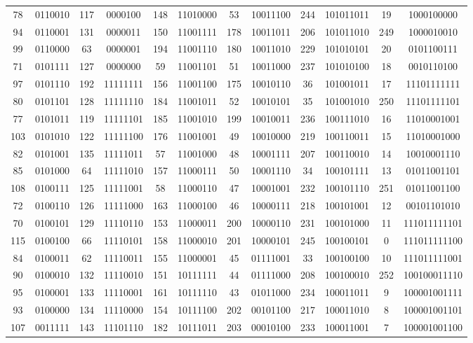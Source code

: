 \documentclass[conference,onecolumn,12pt]{IEEEtran}
\numberwithin{equation}{subsection}
\begin{document}
\begin{itemize}
\begin{table}[H]
\begin{tabular}{cccccccccccc}
78 & 0110010 & 117 & 0000100 & 148 & 11010000 & 53 & 10011100 & 244 & 101011011 & 19 & 1000100000 \\
94 & 0110001 & 131 & 0000011 & 150 & 11001111 & 178 & 10011011 & 206 & 101011010 & 249 & 1000010010 \\
99 & 0110000 & 63 & 0000001 & 194 & 11001110 & 180 & 10011010 & 229 & 101010101 & 20 & 0101100111 \\
71 & 0101111 & 127 & 0000000 & 59 & 11001101 & 51 & 10011000 & 237 & 101010100 & 18 & 0010110100 \\
97 & 0101110 & 192 & 11111111 & 156 & 11001100 & 175 & 10010110 & 36 & 101001011 & 17 & 11101111111 \\
80 & 0101101 & 128 & 11111110 & 184 & 11001011 & 52 & 10010101 & 35 & 101001010 & 250 & 11101111101 \\
77 & 0101011 & 119 & 11111101 & 185 & 11001010 & 199 & 10010011 & 236 & 100111010 & 16 & 11010001001 \\
103 & 0101010 & 122 & 11111100 & 176 & 11001001 & 49 & 10010000 & 219 & 100110011 & 15 & 11010001000 \\
82 & 0101001 & 135 & 11111011 & 57 & 11001000 & 48 & 10001111 & 207 & 100110010 & 14 & 10010001110 \\
85 & 0101000 & 64 & 11111010 & 157 & 11000111 & 50 & 10001110 & 34 & 100101111 & 13 & 01011001101 \\
108 & 0100111 & 125 & 11111001 & 58 & 11000110 & 47 & 10001001 & 232 & 100101110 & 251 & 01011001100 \\
72 & 0100110 & 126 & 11111000 & 163 & 11000100 & 46 & 10000111 & 218 & 100101001 & 12 & 00101101010 \\
70 & 0100101 & 129 & 11110110 & 153 & 11000011 & 200 & 10000110 & 231 & 100101000 & 11 & 111011111101 \\
115 & 0100100 & 66 & 11110101 & 158 & 11000010 & 201 & 10000101 & 245 & 100100101 & 0 & 111011111100 \\
84 & 0100011 & 62 & 11110011 & 155 & 11000001 & 45 & 01111001 & 33 & 100100100 & 10 & 111011111001 \\
90 & 0100010 & 132 & 11110010 & 151 & 10111111 & 44 & 01111000 & 208 & 100100010 & 252 & 100100011110 \\
95 & 0100001 & 133 & 11110001 & 161 & 10111110 & 43 & 01011000 & 234 & 100011011 & 9 & 100001001111 \\
93 & 0100000 & 134 & 11110000 & 154 & 10111100 & 202 & 00101100 & 217 & 100011010 & 8 & 100001001101 \\
107 & 0011111 & 143 & 11101110 & 182 & 10111011 & 203 & 00010100 & 233 & 100011001 & 7 & 100001001100 \\

\end{tabular}
\end{table}
\end{itemize}
\end{document}
